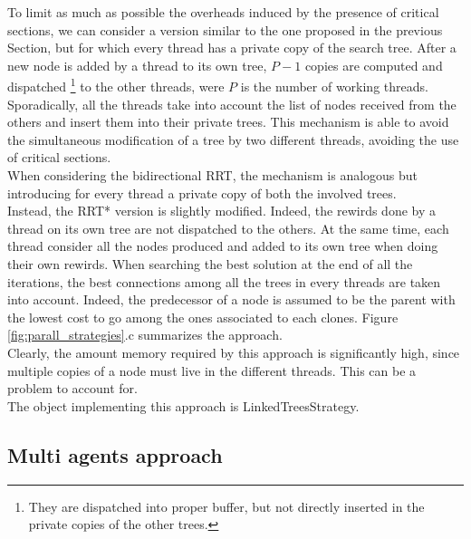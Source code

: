 To limit as much as possible the overheads induced by the presence of critical sections, we can consider a version similar to the one proposed in the previous Section, but for which every thread has a private copy of the search tree. After a new node is added by a thread to its own tree, $P-1$ copies are computed and dispatched \footnote{They are dispatched into proper buffer, but not directly inserted in the private copies of the other trees.} to the other threads, were $P$ is the number of working threads.
Sporadically, all the threads take into account the list of nodes received from the others and insert them into their private trees. This mechanism is able to avoid the simultaneous modification of a tree by two different threads, avoiding the use of critical sections.
\\
When considering the bidirectional RRT, the mechanism is analogous but introducing for every thread a private
copy of both the involved trees. 
\\
Instead, the RRT* version is slightly modified. Indeed, the rewirds done by a thread on its own tree are not dispatched to the others.
At the same time, each thread consider all the nodes produced and added to its own tree when doing their own rewirds.
When searching the best solution at the end of all the iterations, the best connections among all the trees in every threads are taken into account. Indeed, the predecessor of a node is assumed to be the parent with the lowest cost to go among the ones associated to each clones. Figure \ref{fig:parall_strategies}.c summarizes the approach.
\\
Clearly, the amount memory required by this approach is significantly high, since multiple copies of a node must live in the different threads.
This can be a problem to account for.
\\
The object implementing this approach is LinkedTreesStrategy.

\subsection{Multi agents approach}
\label{sec:strtg_multi}

